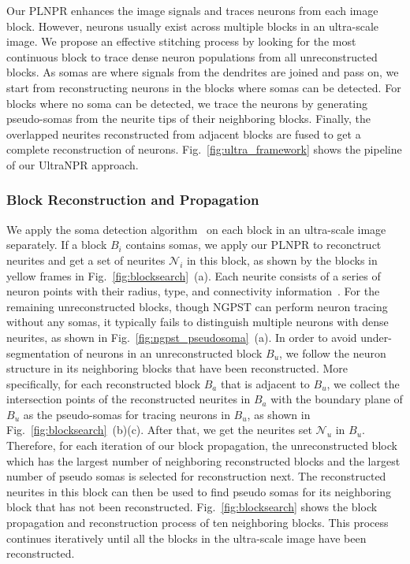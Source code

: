 Our PLNPR enhances the image signals and traces neurons from each image block.
However, neurons usually exist across multiple blocks in an ultra-scale image. 
% 
We propose an effective stitching process by looking for the most continuous block to trace dense neuron populations from all unreconstructed blocks. 
%
As somas are where signals from the dendrites are joined and pass on, we start from reconstructing neurons in the blocks where somas can be detected.
For blocks where no soma can be detected, we trace the neurons by generating pseudo-somas from the neurite tips of their neighboring blocks. 
%
Finally, the overlapped neurites reconstructed from adjacent blocks are fused to get a complete reconstruction of neurons. 
Fig.~\ref{fig:ultra_framework} shows the pipeline of our UltraNPR approach. 
 

\subsubsection{Block Reconstruction and Propagation}
\label{sec:trace}


 
We apply the soma detection algorithm~\cite{Quan2013} on each block in an ultra-scale image separately. 
If a block $B_{i}$ contains somas, we apply our PLNPR to reconctruct neurites and get a set of neurites $\mathcal{N}_{i}$ in this block, as shown by the blocks in yellow frames in Fig.~\ref{fig:blocksearch}~(a).
Each neurite consists of a series of neuron points with their radius, type, and connectivity information~\cite{Cannon1998}.
For the remaining unreconstructed blocks, though NGPST can perform neuron tracing without any somas, it typically fails to distinguish multiple neurons with dense neurites, as shown in Fig.~\ref{fig:ngpst_pseudosoma}~(a).	
%
In order to avoid under-segmentation of neurons in an unreconstructed block $B_u$, we follow the neuron structure in its neighboring blocks that have been reconstructed.
%
More specifically, for each reconstructed block $B_a$ that is adjacent to $B_u$, we collect the intersection points of the reconstructed neurites in $B_a$ with the boundary plane of $B_u$ as the pseudo-somas for tracing neurons in $B_u$, as shown in Fig.~\ref{fig:blocksearch}~(b)(c). After that, we get the neurites set $ \mathcal{N}_u$ in $B_u$.
%
Therefore, for each iteration of our block propagation, the unreconstructed block which has the largest number of neighboring reconstructed blocks and the largest number of pseudo somas is selected for reconstruction next.
The reconstructed neurites in this block can then be used to find pseudo somas for its neighboring block that has not been reconstructed.
%
Fig.~\ref{fig:blocksearch} shows the block propagation and reconstruction process of ten neighboring blocks. 
%
This process continues iteratively until all the blocks in the ultra-scale image have been reconstructed. 
%

